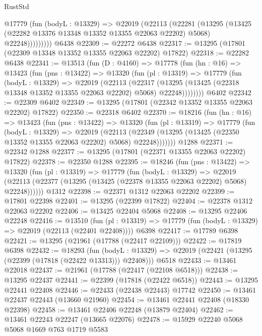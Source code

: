 \begin{lexlean}{RustStd}
\begin{coremodule}
            @17779
              (fun (bodyL : @13329) =>
              @22019
                (@22113
                  (@22281
                    (@13295
                      (@13425 (@22282 @13376 @13348 @13352 @13355 @22063 @22202) @5068)
                      @22248)))))))))
    @6438
@22309 := @22272 @6438
@22317 := @13295 (@17801 (@22309 @13348 @13352 @13355 @22063 @22202) @17822)
@22318 := @22282 @6438
@22341 := @13513
    (fun (D : @4160) =>
    @17778
      (fun (hn : @16) =>
      @13423
        (fun (pns : @13422) =>
        @13320
          (fun (pl : @13319) =>
          @17779
            (fun (bodyL : @13329) =>
            @22019
              (@22113
                (@22317
                  (@13295 (@13425 (@22318 @13348 @13352 @13355 @22063 @22202) @5068) @22248))))))))
    @6402
@22342 := @22309 @6402
@22349 := @13295 (@17801 (@22342 @13352 @13355 @22063 @22202) @17822)
@22350 := @22318 @6402
@22370 := @18216
    (fun (hn : @16) =>
    @13423
      (fun (pns : @13422) =>
      @13320
        (fun (pl : @13319) =>
        @17779
          (fun (bodyL : @13329) =>
          @22019
            (@22113
              (@22349 (@13295 (@13425 (@22350 @13352 @13355 @22063 @22202) @5068) @22248)))))))
    @1288
@22371 := @22342 @1288
@22377 := @13295 (@17801 (@22371 @13355 @22063 @22202) @17822)
@22378 := @22350 @1288
@22395 := @18246
    (fun (pns : @13422) =>
    @13320
      (fun (pl : @13319) =>
      @17779
        (fun (bodyL : @13329) =>
        @22019 (@22113 (@22377 (@13295 (@13425 (@22378 @13355 @22063 @22202) @5068) @22248))))))
    @1312
@22398 := @22371 @1312 @22063 @22202
@22399 := @17801 @22398
@22401 := @13295 (@22399 @17822)
@22404 := @22378 @1312 @22063 @22202
@22406 := @13425 @22404 @5068
@22408 := @13295 @22406 @22248
@22416 := @13510
    (fun (pl : @13319) => @17779 (fun (bodyL : @13329) => @22019 (@22113 (@22401 @22408))))
    @6398
@22417 := @17789 @6398
@22421 := @13295 (@21961 (@17788 (@22417 @22109)))
@22422 := @17819 @6398
@22432 := @18293
    (fun (bodyL : @13329) => @22019 (@22421 (@13295 (@22399 (@17818 (@22422 @13313))) @22408)))
    @6518
@22433 := @13461 @22018
@22437 := @21961 (@17788 (@22417 (@22108 @6518)))
@22438 := @13295 @22437
@22441 := @22399 (@17818 (@22422 @6518))
@22443 := @13295 @22441 @22408
@22446 := @22433 (@22438 @22443) @17742
@22450 := @13461 @22437 @22443 (@13660 @21960)
@22454 := @13461 @22441 @22408 (@18330 @22398)
@22458 := @13461 @22406 @22248 (@13879 @22404)
@22462 := @13461 @22243 @22247 (@13665 @22076)
@22478 := @15929
    @22240
    @5068
    @5068
    @1669
    @763
    @1719
    @5583

\end{coremodule}
\end{lexlean}

